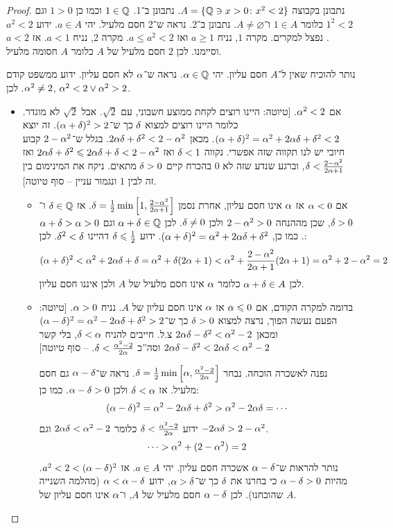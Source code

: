 \documentclass[name=רשימות חשבון דיפרנציאלי ואינטגרלי 1א]{../../../tex/classes/megasumPreamble}
\begin{document}
	\begin{proof}
		נתבונן בקבוצה $A = \{\mathbb{Q} \ni x > 0 \colon x^2 < 2\}$. נתבונן ב־1. $1 \in \mathbb{Q}$ וכמו כן $1 > 0$ וגם $1^2 < 2$ כלומר $1 \in A$ ו־$A \neq \varnothing$. נתבונן ב־2. נראה ש־2 חסם מלעיל. יהי $a \in A$. ידוע $a^2 < 2$. נפצל למקרים. מקרה $1$, נניח $a \ge 1$ ואז $a \le a^2 < 2$. מקרה 2, נניח $a<1$. אז $a<2$ וסיימנו. לכן $2$ חסם מלעיל של $A$ כלומר $A$ חסומה מלעיל.

		נותר להוכיח שאין ל־$A$ חסם עליון. יהי $\alpha \in \mathbb{Q}$. נראה ש־$\alpha$ לא חסם עליון. ידוע ממשפט קודם $\alpha^2 \neq 2$. לכן, $\alpha^2 < 2 \lor \alpha^2 > 2$.
		\begin{itemize}
			\item אם $\alpha^2 < 2$.
			[טיוטה: היינו רוצים לקחת ממוצע חשבוני, עם $\sqrt 2$. אבל $\sqrt 2$ לא מוגדר. כלומר היינו רוצים למצוא $\delta$ כך ש־$(\alpha + \delta)^2 >2$. זה יוצא $(\alpha + \delta)^2 = \alpha^2 + 2\alpha \delta + \delta^2 < 2$. מכאן $2\alpha\delta + \delta^2 < 2 - \alpha^2$. בגלל ש־$2 - \alpha^2$ קבוע חיובי יש לנו תקווה שזה אפשרי. נקווה $\delta < 1$ ואז $2\alpha\delta + \delta^2 \leqslant 2\alpha\delta + \delta < 2 - \alpha^2$ ואז $\delta < \frac{2 - \alpha^2}{2\alpha + 1}$, וברגע שנדע שזה לא $0$ בהכרח קיים $\delta > 0$ מתאים. ניקח את המינימום בין זה לבין $1$ ונגמור עניין – סוף טיוטה].
			\begin{itemize}
				\item אם $\alpha < 0$ אז $\alpha$ אינו חסם עליון, אחרת נסמן $\delta = \frac{1}{2} \min \left [ 1, \frac{2 - \alpha^2}{2\alpha + 1} \right ]$. אז $\delta \in \mathbb{Q}$ ו־$\delta > 0$, שכן מההנחה $2 - \alpha^2 > 0$ ולכן $\delta \neq 0$. לכן $\alpha + \delta \in \mathbb{Q}$ וגם $\alpha + \delta > \alpha > 0$. כמו כן, $(\alpha + \delta)^2 = \alpha^2 + 2\alpha\delta + \delta^2$. ידוע $\delta \leqslant \frac{1}{2}$ דהיינו $\delta^2 < \delta$. לכן:
				\[ (\alpha + \delta)^2 < \alpha^2 + 2\alpha\delta + \delta = \alpha^2 + \delta(2\alpha + 1) < \alpha^2 + \frac{2 - \alpha^2}{2\alpha + 1}(2\alpha + 1) = \alpha^2 + 2 - \alpha^2 = 2 \]
				לכן $\alpha + \delta \in A$ כלומר $\alpha$ אינו חסם מלעיל של $A$ ולכן איננו חסם עליון.
				\item בדומה למקרה הקודם, אם $\alpha \leqslant 0$ אז $\alpha$ אינו חסם עליון של $A$. נניח $\alpha > 0$. [טיוטה: הפעם נעשה הפוך, נרצה למצוא $\delta > 0$ כך ש־$(\alpha - \delta)^2 = \alpha^2 - 2\alpha\delta + \delta^2 > 2$ ומכאן $2\alpha\delta - \delta^2 < \alpha^2 - 2$ צ.ל. חייבים להניח $\delta < \alpha$, בלי קשר $2 \alpha \delta - \delta^2 < 2 \alpha \delta < \alpha^2 - 2$ וסה''כ $\delta < \frac{\alpha^2 - 2}{2\alpha}$.  – סוף טיוטה]

				נפנה לאשכרה הוכחה. נבחר $\delta = \frac{1}{2}\min \left [ \alpha, \frac{\alpha^2 - 2}{2\alpha} \right ]$. נראה ש־$\alpha - \delta$ גם חסם מלעיל. אז $\delta < \alpha$ ולכן $\alpha - \delta >0$. כמו כן:
				\[ (\alpha - \delta)^2 = \alpha ^2 - 2\alpha \delta + \delta^2 > \alpha^2 - 2 \alpha \delta = \cdots \]
				ידוע $\delta < \frac{\alpha^2 - 2}{2\alpha}$ כלומר $2\alpha\delta < \alpha^2 - 2$ וגם $-2\alpha\delta > 2 - \alpha^2$.
				\[ \cdots > \alpha^2 + (2 - \alpha^2) = 2 \]
				נותר להראות ש־$\alpha - \delta$ אשכרה חסם עליון. יהי $a \in A$. אז $a^2 < 2 < (\alpha - \delta)^2$. מהיות $\alpha - \delta > 0$ כי בחרנו את $\delta$ כך ש־$\alpha > \delta$, ידוע $\alpha < \alpha - \delta$ (מהלמה השנייה שהוכחנו). לכן $\alpha - \delta$ חסם מלעיל של $A$, ו־$\alpha$ אינו חסם עליון של $A$.
			\end{itemize}
		\end{itemize}
	\end{proof}
\end{document}
